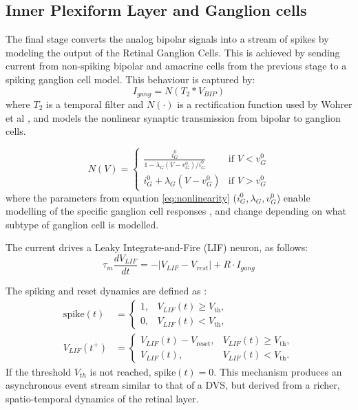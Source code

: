 \documentclass{article}
\begin{document}
\subsection{Inner Plexiform Layer and Ganglion cells }

The final stage converts the analog bipolar signals into a stream of spikes by modeling the output of the Retinal Ganglion Cells. This is achieved by sending current from non-spiking bipolar and amacrine cells from the previous stage to a spiking ganglion cell model. This behaviour is captured by:
\begin{equation}
     I_{gang} = N(T_2 * V_{BIP})
    \label{eq:I_gang}
 \end{equation}
where $T_2$ is a temporal filter and $N(\cdot)$ is a rectification function used by Wohrer et al \cite{wohrer_virtual_2009}, and models the nonlinear synaptic transmission from bipolar to ganglion cells.

\begin{equation}
    N(V) =
    \begin{cases}
        \frac{i_{G}^{0}}{1 - \lambda_{G}(V-v_{G}^0)/i^{0}_{G}}  & \text{if }V < v_{G}^0 \\
        i_{G}^0 + \lambda_{G}(V-v_{G}^0) & \text{if } V > v_{G}^{0}
    \end{cases}
    \label{eq:nonlinearity}
\end{equation}
where the parameters from equation \ref{eq:nonlinearity} ($i_{G}^0, \lambda_{G}, v_{G}^{0}$) enable modelling of the specific ganglion cell responses \cite{wohrer_virtual_2009}, and change depending on what subtype of ganglion cell is modelled.


The current drives a Leaky Integrate-and-Fire (LIF) neuron, as follows: 
\begin{equation}
    \tau_{m} \frac{dV_{LIF}}{dt} = - |V_{LIF} - V_{rest}| + R \cdot I_{gang}
    \label{eq:Gang_LIF}
\end{equation}


The spiking and reset dynamics are defined as :\begin{align}
\label{eq:spike}
\mathrm{spike}(t) &= 
\begin{cases}
1, & V_{LIF}(t) \ge V_{\mathrm{th}},\\
0, & V_{LIF}(t) < V_{\mathrm{th}},
\end{cases}\\[1ex]
V_{LIF}(t^+) &=
\begin{cases}
V_{LIF}(t) -  V_{\mathrm{reset}}, & V_{LIF}(t) \ge V_{\mathrm{th}},\\
V_{LIF}(t), & V_{LIF}(t) < V_{\mathrm{th}}.
\end{cases}
\label{eq:reset}
\end{align}
If the threshold $V_{th}$ is not reached, $\text{spike}(t) = 0$. This mechanism produces an asynchronous event stream similar to that of a DVS, but derived from a richer, spatio-temporal dynamics of the retinal layer.
\end{document}
